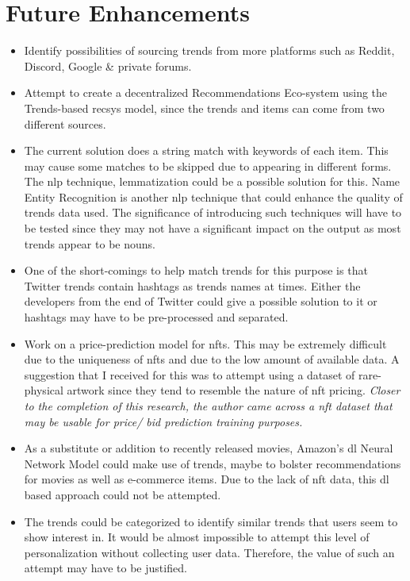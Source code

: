 \section{Future Enhancements}
\begin{itemize}
\item Identify possibilities of sourcing trends from more platforms such as Reddit, Discord, Google \& private forums.
\item Attempt to create a decentralized Recommendations Eco-system using the Trends-based \gls{recsys} model, since the trends and items can come from two different sources.
\item The current solution does a string match with keywords of each item. This may cause some matches to be skipped due to appearing in different forms. The \gls{nlp} technique, lemmatization could be a possible solution for this. Name Entity Recognition is another \gls{nlp} technique that could enhance the quality of trends data used. The significance of introducing such techniques will have to be tested since they may not have a significant impact on the output as most trends appear to be nouns.
\item One of the short-comings to help match trends for this purpose is that Twitter trends contain hashtags as trends names at times. Either the developers from the end of Twitter could give a possible solution to it or hashtags may have to be pre-processed and separated.
\item Work on a price-prediction model for \gls{nft}s. This may be extremely difficult due to the uniqueness of \gls{nft}s and due to the low amount of available data. A suggestion that I received for this was to attempt using a dataset of rare-physical artwork since they tend to resemble the nature of \gls{nft} pricing.
\textit{Closer to the completion of this research, the author came across a \gls{nft} dataset \autocite{zomglings_ethereum_2021} that may be usable for price/ bid prediction training purposes.}
\item As a substitute or addition to recently released movies, Amazon's \gls{dl} Neural Network Model could make use of trends, maybe to bolster recommendations for movies as well as e-commerce items. Due to the lack of \gls{nft} data, this \gls{dl} based approach could not be attempted.
\item The trends could be categorized to identify similar trends that users seem to show interest in. It would be almost impossible to attempt this level of personalization without collecting user data. Therefore, the value of such an attempt may have to be justified.
\end{itemize}


